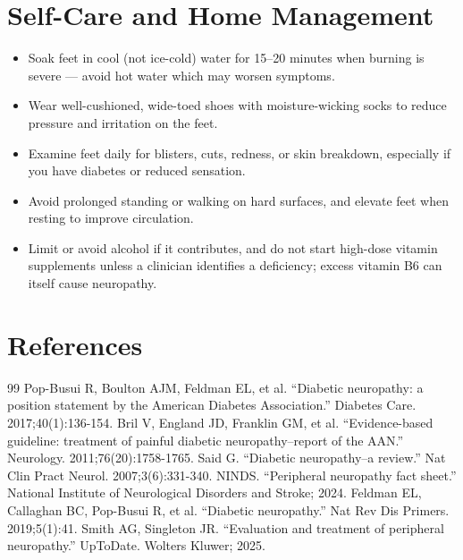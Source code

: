 \section*{Self-Care and Home Management}
\begin{itemize}
 \item Soak feet in cool (not ice-cold) water for 15–20 minutes when burning is severe — avoid hot water which may worsen symptoms.
 \item Wear well-cushioned, wide-toed shoes with moisture-wicking socks to reduce pressure and irritation on the feet.
 \item Examine feet daily for blisters, cuts, redness, or skin breakdown, especially if you have diabetes or reduced sensation.
 \item Avoid prolonged standing or walking on hard surfaces, and elevate feet when resting to improve circulation.
 \item Limit or avoid alcohol if it contributes, and do not start high-dose vitamin supplements unless a clinician identifies a deficiency; excess vitamin B6 can itself cause neuropathy.
\end{itemize}

\section*{References}
\begin{thebibliography}{99}
 Pop-Busui R, Boulton AJM, Feldman EL, et al. ``Diabetic neuropathy: a position statement by the American Diabetes Association.'' Diabetes Care. 2017;40(1):136-154.
 Bril V, England JD, Franklin GM, et al. ``Evidence-based guideline: treatment of painful diabetic neuropathy--report of the AAN.'' Neurology. 2011;76(20):1758-1765.
 Said G. ``Diabetic neuropathy--a review.'' Nat Clin Pract Neurol. 2007;3(6):331-340.
 NINDS. ``Peripheral neuropathy fact sheet.'' National Institute of Neurological Disorders and Stroke; 2024.
 Feldman EL, Callaghan BC, Pop-Busui R, et al. ``Diabetic neuropathy.'' Nat Rev Dis Primers. 2019;5(1):41.
 Smith AG, Singleton JR. ``Evaluation and treatment of peripheral neuropathy.'' UpToDate. Wolters Kluwer; 2025.
\end{thebibliography}
